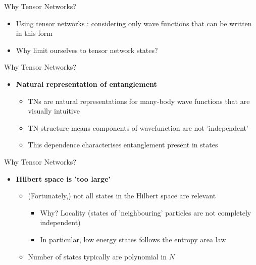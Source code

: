 \documentclass{beamer}
\begin{document}
\begin{frame}{Why Tensor Networks?}
	\begin{itemize}
	\item Using tensor networks : considering only wave functions that can be written in this form
	\item Why limit ourselves to tensor network states?
	\end{itemize}
\end{frame}

\begin{frame}{Why Tensor Networks?}
	\begin{itemize}
		\item \textbf{Natural representation of entanglement}
			\begin{itemize}
			\item TNs are natural representations for many-body wave functions that are visually intuitive
			\item TN structure means components of wavefunction are not 'independent'
			\item This dependence characterises entanglement present in states
			\end{itemize}
	\end{itemize}
\end{frame}

\begin{frame}{Why Tensor Networks?}
	\begin{itemize}
		\item \textbf{Hilbert space is 'too large'}
			\begin{itemize}
			\item (Fortunately,) not all states in the Hilbert space are relevant
				\begin{itemize}
			\item Why? Locality (states of 'neighbouring' particles are not completely independent)
			\item In particular, low energy states follows the entropy area law
			\end{itemize}
		\item Number of states typically are polynomial in ${ N }$
			\end{itemize}
	\end{itemize}
\end{frame}
\end{document}
